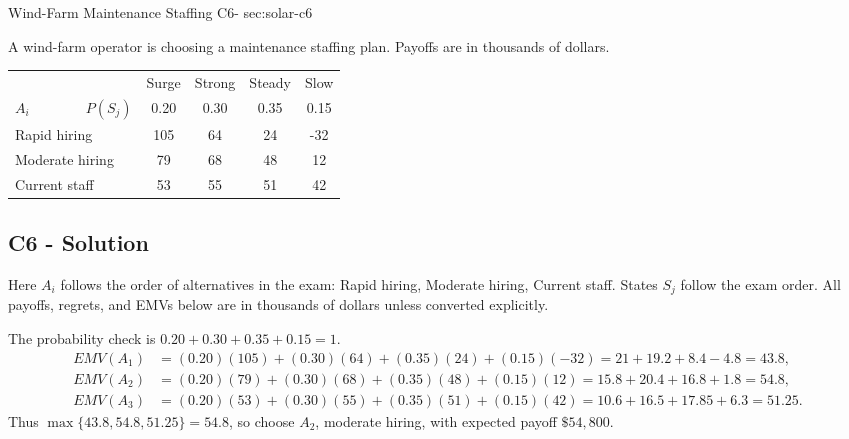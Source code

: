 \sectionScored
	{Wind-Farm Maintenance Staffing}
	{C6-}
	{sec:solar-c6}
	{
	A wind-farm operator is choosing a maintenance staffing plan. Payoffs are in thousands of dollars.
		\begin{center}\setlength{\tabcolsep}{1.5pt}\renewcommand{\arraystretch}{1.1}
			\begin{tabular}{lcccc}\toprule
			&Surge&Strong&Steady&Slow\\
			$A_i \qquad \qquad P(S_j)$&0.20&0.30&0.35&0.15\\ \midrule
			Rapid hiring&105&64&24&-32\\
			Moderate hiring&79&68&48&12\\
			Current staff&53&55&51&42\\ \bottomrule
			\end{tabular}
		\end{center}


	\label{subsec:solar-c6-solution}
	\subsection*{C6 - Solution }

	Here $A_i$ follows the order of alternatives in the exam: Rapid hiring, Moderate hiring, Current staff. States $S_j$ follow the exam order. All payoffs, regrets, and EMVs below are in thousands of dollars unless converted explicitly.

		The probability check is $0.20+0.30+0.35+0.15=1$.
		\begin{align*}
			EMV(A_1)&=(0.20)(105)+(0.30)(64)+(0.35)(24)+(0.15)(-32)=21+19.2+8.4-4.8=43.8,\\
EMV(A_2)&=(0.20)(79)+(0.30)(68)+(0.35)(48)+(0.15)(12)=15.8+20.4+16.8+1.8=54.8,\\
			EMV(A_3)&=(0.20)(53)+(0.30)(55)+(0.35)(51)+(0.15)(42)=10.6+16.5+17.85+6.3=51.25.
		\end{align*}
		Thus $\max\{43.8,54.8,51.25\}=54.8$, so choose $\boxed{A_2}$, moderate hiring, with expected payoff $\$54{,}800$.

	}

